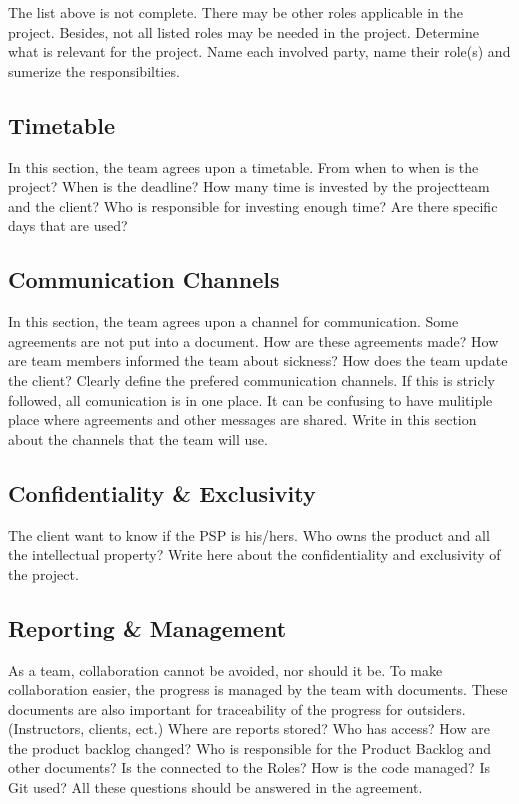 \documentclass[10pt]{report}
\begin{document}
The list above is not complete. There may be other roles applicable in the project. Besides, not all listed roles may be needed in the project. Determine what is relevant for the project. Name each involved party, name their role(s) and sumerize the responsibilties.

\subsection{Timetable}

In this section, the team agrees upon a timetable. From when to when is the project? When is the deadline? How many time is invested by the projectteam and the client? Who is responsible for investing enough time? Are there specific days that are used?

\subsection{Communication Channels}

In this section, the team agrees upon a channel for communication. Some agreements are not put into a document. How are these agreements made? How are team members informed the team about sickness? How does the team update the client? Clearly define the prefered communication channels. If this is stricly followed, all comunication is in one place. It can be confusing to have mulitiple place where agreements and other messages are shared. Write in this section about the channels that the team will use.

\subsection{Confidentiality \& Exclusivity}

The client want to know if the PSP is his/hers. Who owns the product and all the intellectual property? Write here about the confidentiality and exclusivity of the project.

\subsection{Reporting \& Management}

As a team, collaboration cannot be avoided, nor should it be. To make collaboration easier, the progress is managed by the team with documents. These documents are also important for traceability of the progress for outsiders. (Instructors, clients, ect.) Where are reports stored? Who has access? How are the product backlog changed? Who is responsible for the Product Backlog and other documents? Is the connected to the Roles? How is the code managed? Is Git used? All these questions should be answered in the agreement.
\end{document}
